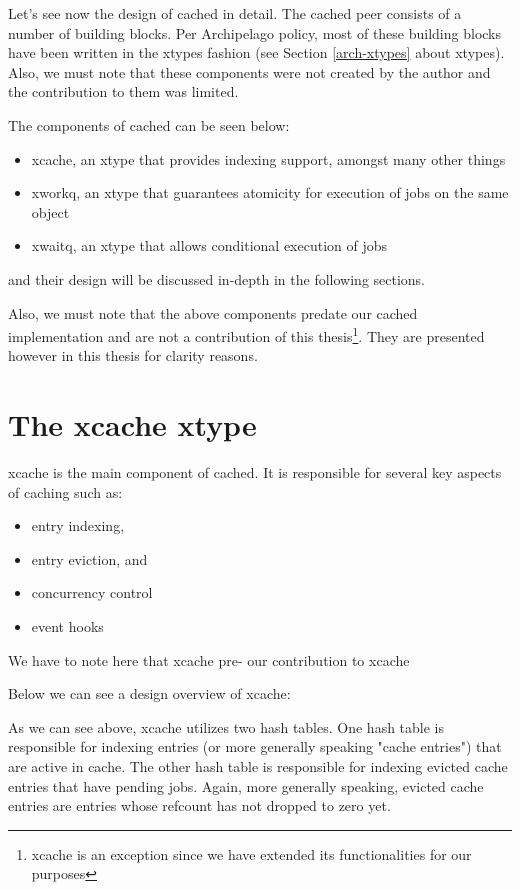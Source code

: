Let's see now the design of cached in detail. The cached peer consists of a 
number of building blocks.  Per Archipelago policy, most of these building 
blocks have been written in the xtypes fashion (see Section \ref{arch-xtypes} 
about xtypes). Also, we must note that these components were not created by the 
author and the contribution to them was limited.

The components of cached can be seen below:
 
\begin{itemize}
	\item xcache, an xtype that provides indexing support, amongst many 
		other things
	\item xworkq, an xtype that guarantees atomicity for execution of jobs 
		on the same object
	\item xwaitq, an xtype that allows conditional execution of jobs
\end{itemize}

and their design will be discussed in-depth in the following sections.

Also, we must note that the above components predate our cached implementation 
and are not a contribution of this thesis\footnote{xcache is an exception since 
	we have extended its functionalities for our purposes}. They are 
presented however in this thesis for clarity reasons. 

\section{The xcache xtype}\label{sec:xcache-design}

xcache is the main component of cached. It is responsible for several key 
aspects of caching such as:

\begin{itemize}
	\item entry indexing,
	\item entry eviction, and
	\item concurrency control
	\item event hooks
\end{itemize}

We have to note here that xcache pre- our contribution to xcache 

Below we can see a design overview of xcache:


As we can see above, xcache utilizes two hash tables. One hash table is 
responsible for indexing entries (or more generally speaking "cache entries") 
that are active in cache.  The other hash table is responsible for indexing 
evicted cache entries that have pending jobs.  Again, more generally speaking, 
evicted cache entries are entries whose refcount has not dropped to zero yet.

